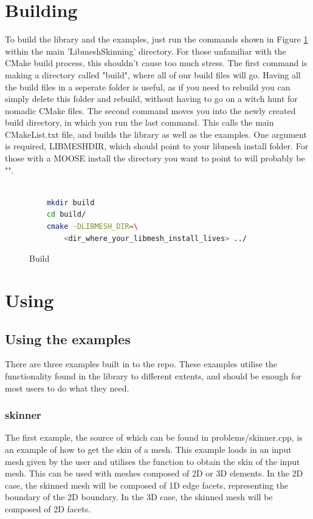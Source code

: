 \documentclass[12pt, letterpaper]{article}
\begin{document}
\section{Building}
To build the library and the examples, just run the commands shown in Figure \ref{buildCommands} within the main 'Libmesh\textendash Skinning' directory. For those unfamiliar with the CMake build process, this shouldn't cause too much stress. The first command is making a directory called "build", where all of our build files will go. Having all the build files in a seperate folder is useful, as if you need to rebuild you can simply delete this folder and rebuild, without having to go on a witch hunt for nomadic CMake files. The second command moves you into the newly created build directory, in which you run the last command. This calls the main CMakeList.txt file, and builds the library as well as the examples. One argument is required, LIBMESH\textendash DIR, which should point to your libmesh install folder. For those with a MOOSE install the directory you want to point to will probably be "".

\begin{figure}[ht]
\begin{lstlisting}[language=bash]

	mkdir build
	cd build/
	cmake -DLIBMESH_DIR=\
		<dir_where_your_libmesh_install_lives> ../
\end{lstlisting}
\caption{Build}
\label{buildCommands}
\end{figure}

\section{Using}
\subsection{Using the examples}
There are three examples built in to the repo. These examples utilise  the functionality found in the library to different extents, and should be enough for most users to do what they need.

\subsubsection{skinner}
The first example, the source of which can be found in problems/skinner.cpp, is an example of how to get the skin of a mesh. This example loads in an input mesh given by the user and utilises the function  to obtain the skin of the input mesh. This can be used with meshes composed of 2D or 3D elements. In the 2D case, the skinned mesh will be composed of 1D edge facets, representing the boundary of the 2D boundary. In the 3D case, the skinned mesh will be composed of 2D facets. 
\end{document}
